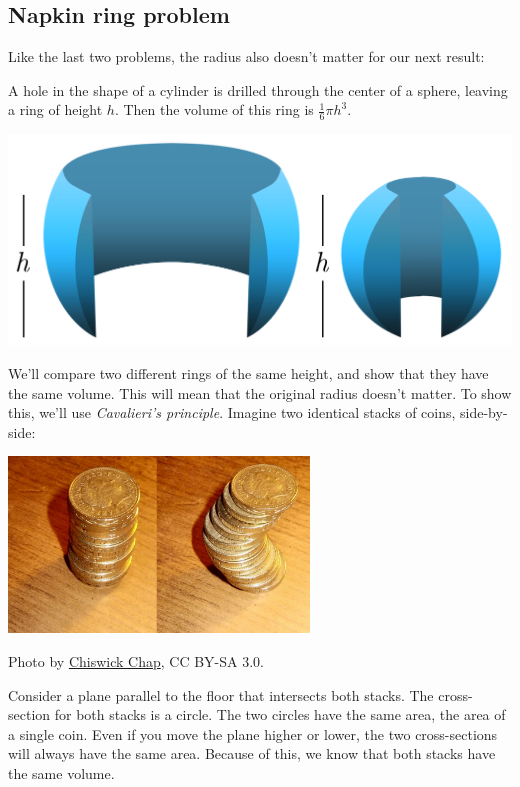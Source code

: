 \documentclass[11pt,paper=letter]{scrartcl}
\begin{document}
\subsection{Napkin ring problem}

Like the last two problems, the radius also doesn't matter for our next result:

\begin{probboxed}
  A hole in the shape of a cylinder is drilled through the center of a sphere, leaving a ring of height $h$. Then the volume of this ring is $\frac16\pi h^3$.
  \begin{center}
    \includegraphics{napkin-ring.png}
  \end{center}
\end{probboxed}

We'll compare two different rings of the same height, and show that they have the same volume. This will mean that the original radius doesn't matter. To show this, we'll use \emph{Cavalieri's principle}. Imagine two identical stacks of coins, side-by-side:
\begin{center}
  \includegraphics[width=8cm]{cavalieri-coins.JPG}

  {\sffamily \footnotesize Photo by \href{https://commons.wikimedia.org/wiki/File:Cavalieri\%27s_Principle_in_Coins.JPG}{Chiswick Chap}, CC BY-SA 3.0.}
\end{center}

Consider a plane parallel to the floor that intersects both stacks. The cross-section for both stacks is a circle. The two circles have the same area, the area of a single coin. Even if you move the plane higher or lower, the two cross-sections will always have the same area. Because of this, we know that both stacks have the same volume.
\end{document}
